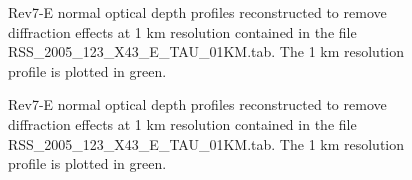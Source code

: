 \documentclass[crop=false,class=book]{standalone}
\begin{document}
\begin{figure}[H]
    \centering
    \caption[Normal Optical Depth Profiles 70000-85000km]{Rev7-E normal optical depth profiles reconstructed to remove diffraction effects at 1 km resolution contained in the file RSS\_2005\_123\_X43\_E\_TAU\_01KM.tab. The 1 km resolution profile is plotted in green.}
\end{figure}
\begin{figure}[H]
    \centering
    \caption[Normal Optical Depth Profiles 85000-100000km]{Rev7-E normal optical depth profiles reconstructed to remove diffraction effects at 1 km resolution contained in the file RSS\_2005\_123\_X43\_E\_TAU\_01KM.tab. The 1 km resolution profile is plotted in green.}
\end{figure}
\end{document}
